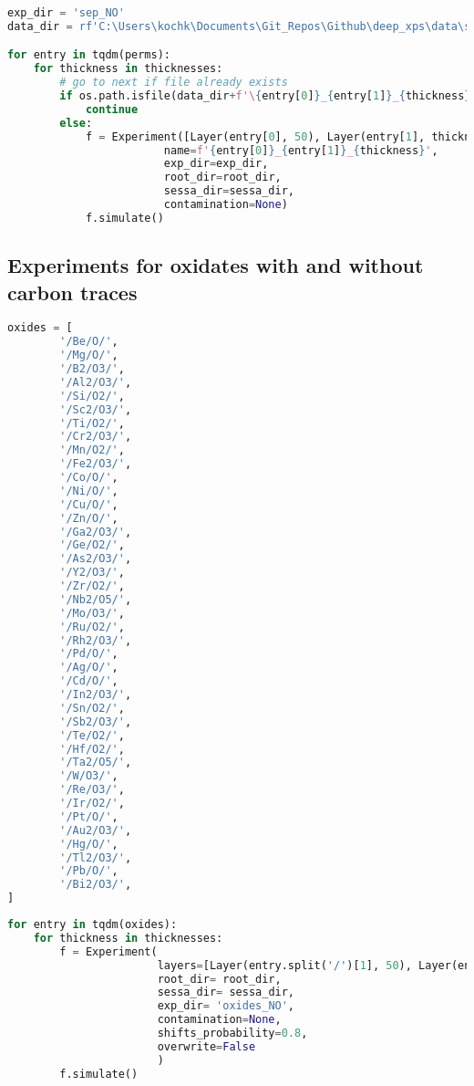\begin{lstlisting}[language=Python]
exp_dir = 'sep_NO'
data_dir = rf'C:\Users\kochk\Documents\Git_Repos\Github\deep_xps\data\simulation_data\{exp_dir}'

for entry in tqdm(perms):
    for thickness in thicknesses:
        # go to next if file already exists
        if os.path.isfile(data_dir+f'\{entry[0]}_{entry[1]}_{thickness}_separate_spectra.spcreg1.spc'):
            continue
        else:
            f = Experiment([Layer(entry[0], 50), Layer(entry[1], thickness)],
                        name=f'{entry[0]}_{entry[1]}_{thickness}',
                        exp_dir=exp_dir,
                        root_dir=root_dir,
                        sessa_dir=sessa_dir,
                        contamination=None)
            f.simulate()
\end{lstlisting}

\hypertarget{experiments-for-oxidates-with-and-without-carbon-traces}{%
\subsection*{Experiments for oxidates with and without carbon
traces}\label{experiments-for-oxidates-with-and-without-carbon-traces}}

\begin{lstlisting}[language=Python]
oxides = [
        '/Be/O/',
        '/Mg/O/',
        '/B2/O3/',
        '/Al2/O3/',
        '/Si/O2/',
        '/Sc2/O3/',
        '/Ti/O2/',
        '/Cr2/O3/',
        '/Mn/O2/',
        '/Fe2/O3/',
        '/Co/O/',
        '/Ni/O/',
        '/Cu/O/',
        '/Zn/O/',
        '/Ga2/O3/',
        '/Ge/O2/',
        '/As2/O3/',
        '/Y2/O3/',
        '/Zr/O2/',
        '/Nb2/O5/',
        '/Mo/O3/',
        '/Ru/O2/',
        '/Rh2/O3/',
        '/Pd/O/',
        '/Ag/O/',
        '/Cd/O/',
        '/In2/O3/',
        '/Sn/O2/',
        '/Sb2/O3/',
        '/Te/O2/',
        '/Hf/O2/',
        '/Ta2/O5/',
        '/W/O3/',
        '/Re/O3/',
        '/Ir/O2/',
        '/Pt/O/',
        '/Au2/O3/',
        '/Hg/O/',
        '/Tl2/O3/',
        '/Pb/O/',
        '/Bi2/O3/',
]
\end{lstlisting}

\begin{lstlisting}[language=Python]
for entry in tqdm(oxides):
    for thickness in thicknesses:
        f = Experiment(
                       layers=[Layer(entry.split('/')[1], 50), Layer(entry, thickness)],
                       root_dir= root_dir,
                       sessa_dir= sessa_dir,
                       exp_dir= 'oxides_NO',
                       contamination=None,
                       shifts_probability=0.8,
                       overwrite=False
                       )
        f.simulate()
\end{lstlisting}

